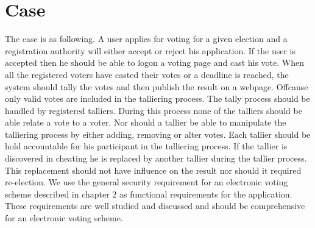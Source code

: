 \section{Case}
The case is as following. A user applies for voting for a given election and a registration authority will either accept or reject his application.  If the user is accepted then he should be able to logon a voting page and cast his vote.  When all the registered voters have casted their votes or a deadline is reached, the system should tally the votes and then publish the result on a webpage. Offcause only valid votes are included in the talliering process. The tally process should be handled by registered talliers. During this process none of the talliers should be able relate a  vote to a voter. Nor should a tallier be able to manipulate the talliering process by either adding, removing or alter votes. Each tallier should be hold accountable for his participant in the talliering process. If the tallier is discovered in cheating he is replaced by another tallier during the tallier process. This replacement should not have influence on the result nor should it required re-election. We use the general security requirement for an electronic voting scheme described in chapter 2 as functional requirements for the application. These requirements are well studied and discussed and should be comprehensive for an electronic voting scheme.